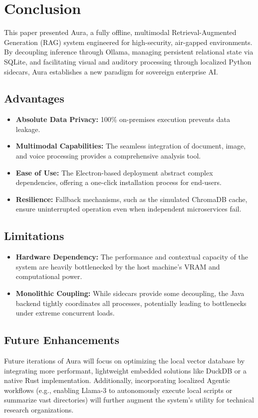 \section{Conclusion}
This paper presented Aura, a fully offline, multimodal Retrieval-Augmented Generation (RAG) system engineered for high-security, air-gapped environments. By decoupling inference through Ollama, managing persistent relational state via SQLite, and facilitating visual and auditory processing through localized Python sidecars, Aura establishes a new paradigm for sovereign enterprise AI.

\subsection{Advantages}
\begin{itemize}
    \item \textbf{Absolute Data Privacy:} 100\% on-premises execution prevents data leakage.
    \item \textbf{Multimodal Capabilities:} The seamless integration of document, image, and voice processing provides a comprehensive analysis tool.
    \item \textbf{Ease of Use:} The Electron-based deployment abstract complex dependencies, offering a one-click installation process for end-users.
    \item \textbf{Resilience:} Fallback mechanisms, such as the simulated ChromaDB cache, ensure uninterrupted operation even when independent microservices fail.
\end{itemize}

\subsection{Limitations}
\begin{itemize}
    \item \textbf{Hardware Dependency:} The performance and contextual capacity of the system are heavily bottlenecked by the host machine's VRAM and computational power.
    \item \textbf{Monolithic Coupling:} While sidecars provide some decoupling, the Java backend tightly coordinates all processes, potentially leading to bottlenecks under extreme concurrent loads.
\end{itemize}

\subsection{Future Enhancements}
Future iterations of Aura will focus on optimizing the local vector database by integrating more performant, lightweight embedded solutions like DuckDB or a native Rust implementation. Additionally, incorporating localized Agentic workflows (e.g., enabling Llama-3 to autonomously execute local scripts or summarize vast directories) will further augment the system's utility for technical research organizations.
